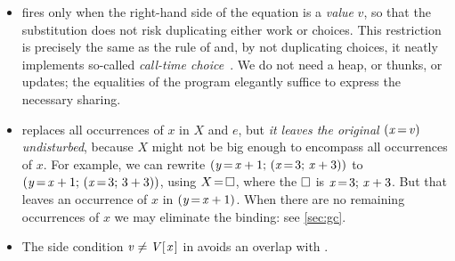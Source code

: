 \documentclass[acmsmall]{acmart}
\newcommand{\Conid}[1]{\mathit{#1}}
\newcommand{\Varid}[1]{\mathit{#1}}
\begin{document}
\begin{itemize}
\item {} fires only when the right-hand side of the equation
  is a \emph{value} \ensuremath{\Varid{v}}, so that the substitution does not risk
  duplicating either work or choices. This
restriction is precisely the same as the  rule of \citet{ariola:call-by-need}
and, by not duplicating choices, it neatly implements so-called \emph{call-time choice}~\cite{hanus:survey}.
We do not need a heap, or thunks, or updates; the equalities of the program elegantly
suffice to express the necessary sharing.
\item {} replaces all occurrences of \ensuremath{\Varid{x}} in \ensuremath{X} and \ensuremath{\Varid{e}}, but
  \emph{it leaves the original \ensuremath{(\Varid{x}\hspace{-0.14em}=\hspace{-0.14em}\Varid{v})} undisturbed}, because \ensuremath{X} might not be
  big enough to encompass all occurrences of \ensuremath{\Varid{x}}.
  For example, we can rewrite \ensuremath{(\Varid{y}\hspace{-0.14em}=\hspace{-0.14em}\Varid{x}\mathbin{+}\mathrm{1};\,(\Varid{x}\hspace{-0.14em}=\hspace{-0.14em}\mathrm{3};\,\Varid{x}\mathbin{+}\mathrm{3}))} to \ensuremath{(\Varid{y}\hspace{-0.14em}=\hspace{-0.14em}\Varid{x}\mathbin{+}\mathrm{1};\,(\Varid{x}\hspace{-0.14em}=\hspace{-0.14em}\mathrm{3};\,\mathrm{3}\mathbin{+}\mathrm{3}))}, using
  \ensuremath{X\hspace{-0.14em}=\hspace{-0.14em}\hole}, where the \ensuremath{\hole} is \ensuremath{\Varid{x}\hspace{-0.14em}=\hspace{-0.14em}\mathrm{3};\,\Varid{x}\mathbin{+}\mathrm{3}}.  But that leaves an occurrence of \ensuremath{\Varid{x}} in \ensuremath{(\Varid{y}\hspace{-0.14em}=\hspace{-0.14em}\Varid{x}\mathbin{+}\mathrm{1})}.
  When there are no remaining occurrences of \ensuremath{\Varid{x}} we may eliminate
  the binding: see \cref{sec:gc}.
\item The side condition $\ensuremath{\Varid{v}} \not= \ensuremath{\Conid{V} [\mskip1.5mu \Varid{x}\mskip1.5mu]}$ in  avoids an overlap with .
\end{itemize}
\end{document}
